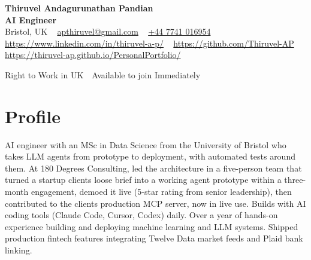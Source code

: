 \documentclass[a4paper,11pt]{article}
\begin{document}
\begin{center}
  {\LARGE\bfseries Thiruvel Andagurunathan Pandian} \\[3pt]
  {\color{headernavy}\small\textbf{AI Engineer}} \\[3pt]
  {\small
  Bristol, UK\nobreak\ \,\textbar\, \href{mailto:apthiruvel@gmail.com}{apthiruvel@gmail.com}\nobreak\ \,\textbar\, \href{tel:+447741016954}{+44 7741 016954}\nobreak\ \,\textbar\, \href{https://www.linkedin.com/in/thiruvel-a-p/}{https://www.linkedin.com/in/thiruvel-a-p/}\nobreak\ \,\textbar\, \href{https://github.com/Thiruvel-AP}{https://github.com/Thiruvel-AP}\nobreak\ \,\textbar\, \href{https://thiruvel-ap.github.io/PersonalPortfolio/}{https://thiruvel-ap.github.io/PersonalPortfolio/}}\par\vspace{4pt}
  \noindent{} Right to Work in UK \,\textbar\, Available to join Immediately
\end{center}

\section{Profile}
AI engineer with an MSc in Data Science from the University of Bristol who takes LLM agents from prototype to deployment, with automated tests around them. At 180 Degrees Consulting, led the architecture in a five-person team that turned a startup client\textquotesingle{}s loose brief into a working agent prototype within a three-month engagement, demoed it live (5-star rating from senior leadership), then contributed to the client\textquotesingle{}s production MCP server, now in live use. Builds with AI coding tools (Claude Code, Cursor, Codex) daily. Over a year of hands-on experience building and deploying machine learning and LLM systems. Shipped production fintech features integrating Twelve Data market feeds and Plaid bank linking.
\end{document}
